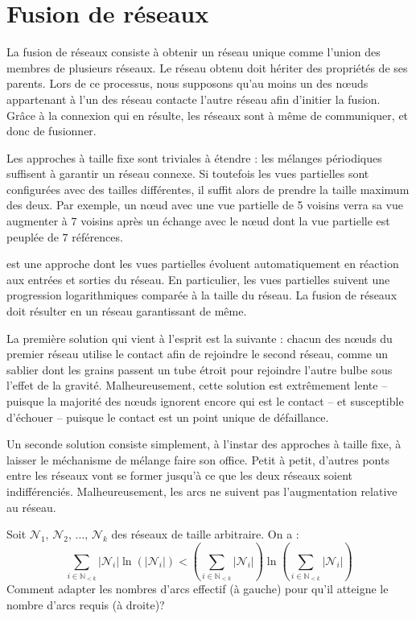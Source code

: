 
\section{Fusion de réseaux}
\label{net:sec:merging}

La fusion de réseaux consiste à obtenir un réseau unique comme l'union des
membres de plusieurs réseaux. Le réseau obtenu doit hériter des propriétés de
ses parents.  Lors de ce processus, nous supposons qu'au moins un des nœuds
appartenant à l'un des réseau contacte l'autre réseau afin d'initier la
fusion. Grâce à la connexion qui en résulte, les réseaux sont à même de
communiquer, et donc de fusionner.

Les approches à taille fixe sont triviales à étendre : les mélanges périodiques
suffisent à garantir un réseau connexe. Si toutefois les vues partielles sont
configurées avec des tailles différentes, il suffit alors de prendre la taille
maximum des deux. Par exemple, un nœud avec une vue partielle de 5 voisins verra
sa vue augmenter à $7$ voisins après un échange avec le nœud dont la vue
partielle est peuplée de $7$ références.

\SPRAY est une approche dont les vues partielles évoluent automatiquement en
réaction aux entrées et sorties du réseau. En particulier, les vues partielles
suivent une progression logarithmiques comparée à la taille du réseau. La fusion
de réseaux \SPRAY doit résulter en un réseau \SPRAY garantissant de même.

La première solution qui vient à l'esprit est la suivante : chacun des nœuds du
premier réseau utilise le contact afin de rejoindre le second réseau, comme un
sablier dont les grains passent un tube étroit pour rejoindre l'autre bulbe sous
l'effet de la gravité. Malheureusement, cette solution est extrêmement lente --
puisque la majorité des nœuds ignorent encore qui est le contact -- et
susceptible d'échouer -- puisque le contact est un point unique de défaillance.

Un seconde solution consiste simplement, à l'instar des approches à taille fixe,
à laisser le méchanisme de mélange faire son office. Petit à petit, d'autres
ponts entre les réseaux vont se former jusqu'à ce que les deux réseaux soient
indifférenciés. Malheureusement, les arcs ne suivent pas l'augmentation relative
au réseau.

\begin{problem}
  Soit $\mathcal{N}_1,\, \mathcal{N}_2,\, \ldots ,\, \mathcal{N}_k$ des réseaux
  de taille arbitraire. On a :
\begin{equation}
  \sum\limits_{i \in \mathbb{N}_{<k}} |\mathcal{N}_i|\ln (|\mathcal{N}_i|) < (\sum\limits_{i \in \mathbb{N}_{<k}} |\mathcal{N}_i|)\ln{(\sum\limits_{i \in \mathbb{N}_{<k}} |\mathcal{N}_i|)}
\end{equation}
Comment adapter les nombres d'arcs effectif (à gauche) pour qu'il atteigne le
nombre d'arcs requis (à droite)?
\end{problem}

